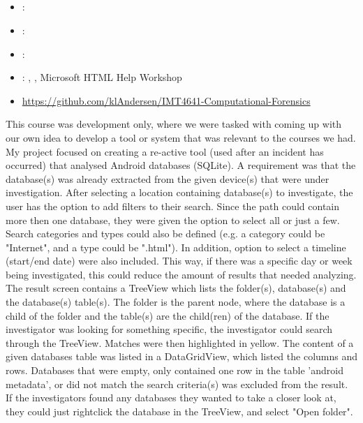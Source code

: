 \subsection[Computational Forensics]{}
\label{sec:comp_forensics}
\begin{itemize} 
	\item {}: 
	\item {}: 
	\item {}: 
	\item {}: , , Microsoft HTML Help Workshop
	\item {} \url{https://github.com/klAndersen/IMT4641-Computational-Forensics}
\end{itemize} 
This course was development only, where we were tasked with coming up with our own idea to develop a tool or system that was relevant to the courses we had.
My project focused on creating a re-active tool (used after an incident has occurred) that analysed Android databases (SQLite). 
A requirement was that the database(s) was already extracted from the given device(s) that were under investigation.
\vspace{0.5em}\newline
After selecting a location containing database(s) to investigate, the user has the option to add filters to their search. 
Since the path could contain more then one database, they were given the option to select all or just a few. 
Search categories and types could also be defined (e.g. a category could be "Internet", and a type could be ".html").
In addition, option to select a timeline (start/end date) were also included. 
This way, if there was a specific day or week being investigated, this could reduce the amount of results that needed analyzing.
\vspace{0.5em}\newline
The result screen contains a TreeView which lists the folder(s), database(s) and the database(s) table(s). 
The folder is the parent node, where the database is a child of the folder and the table(s) are the child(ren) of the database.
If the investigator was looking for something specific, the investigator could search through the TreeView.
Matches were then highlighted in yellow.
\vspace{0.5em}\newline
The content of a given databases table was listed in a DataGridView, which listed the columns and rows.
Databases that were empty, only contained one row in the table 'android metadata', or did not match the search criteria(s) was excluded from the result. 
If the investigators found any databases they wanted to take a closer look at, they could just rightclick the database in the TreeView, and select "Open folder".


